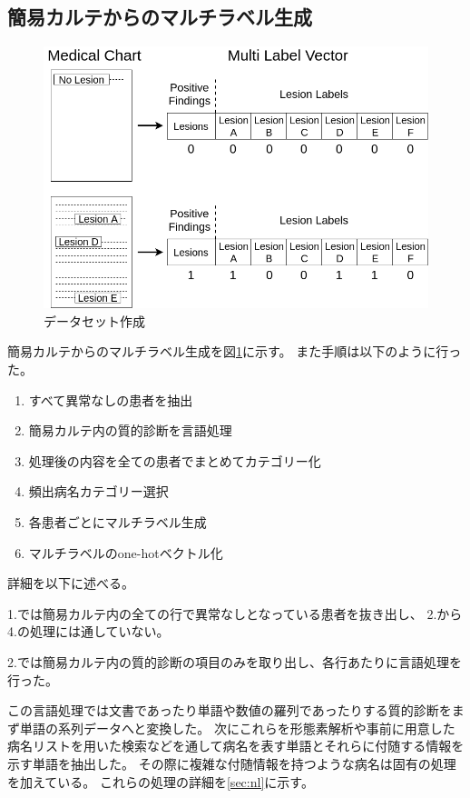 \subsection{簡易カルテからのマルチラベル生成}

\begin{figure}[htbp]
    \begin{center}
        \includegraphics[width=130mm]{./fig/ieice1.png}
        \caption{データセット作成}
        \label{fig:multilabel}
    \end{center}
\end{figure}

簡易カルテからのマルチラベル生成を図\ref{fig:multilabel}に示す。
また手順は以下のように行った。

\begin{enumerate}
    \item すべて異常なしの患者を抽出
    \item 簡易カルテ内の質的診断を言語処理
    \item 処理後の内容を全ての患者でまとめてカテゴリー化
    \item 頻出病名カテゴリー選択
    \item 各患者ごとにマルチラベル生成
    \item マルチラベルのone-hotベクトル化
\end{enumerate}

詳細を以下に述べる。

 1.では簡易カルテ内の全ての行で異常なしとなっている患者を抜き出し、 2.から 4.の処理には通していない。

 2.では簡易カルテ内の質的診断の項目のみを取り出し、各行あたりに言語処理を行った。

この言語処理では文書であったり単語や数値の羅列であったりする質的診断をまず単語の系列データへと変換した。
次にこれらを形態素解析\cite{MeCab}や事前に用意した病名リストを用いた検索などを通して病名を表す単語とそれらに付随する情報を示す単語を抽出した。
その際に複雑な付随情報を持つような病名は固有の処理を加えている。
これらの処理の詳細を\ref{sec:nl}に示す。

